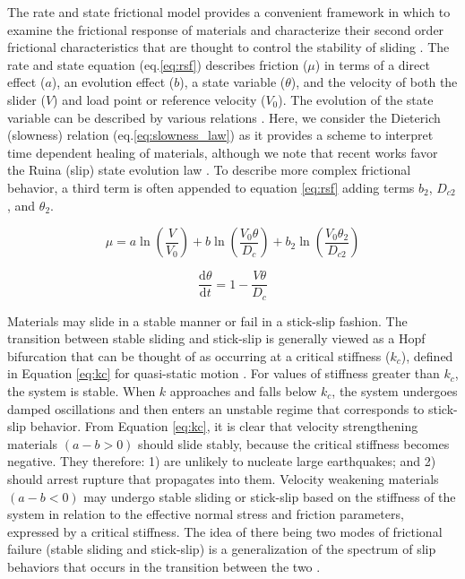 The rate and state frictional model provides a convenient framework in which to
examine the frictional response of materials and characterize their second order
frictional characteristics that are thought to control the stability of sliding
\cite{Brace_1966,Brace_Byerlee_1969,gu1984slip,Marone_1998}.  The rate and state
equation (eq.\ref{eq:rsf}) describes friction ($\mu$) in terms of a direct
effect ($a$), an evolution effect ($b$), a state variable ($\theta$), and the
velocity of both the slider ($V$) and load point or reference velocity ($V_0$).
The evolution of the state variable can be described by various relations
\cite{Marone_1998}.  Here, we consider the Dieterich (slowness) relation
(eq.\ref{eq:slowness_law}) as it provides a scheme to interpret time dependent
healing of materials, although we note that recent works favor the Ruina (slip)
state evolution law \cite{Marone2015,bayart2006evolution}.  To describe more
complex frictional behavior, a third term is often appended to   equation
\ref{eq:rsf} adding terms $b_2$, $D_{c2}$, and $\theta_2$.

\begin{equation}
	\mu =  a  \ln\left(\frac{V}{V_0}\right) + b \ln\left(\frac{V_0 \theta}{D_c}\right) + b_2 \ln\left(\frac{V_0 \theta_2}{D_{c2}}\right)
	\label{eq:rsf}
\end{equation}

\begin{equation}
	\frac{\text{d}\theta}{\text{d}t} = 1 - \frac{V \theta}{D_c}
	\label{eq:slowness_law}
\end{equation}


Materials may slide in a stable manner or fail in a stick-slip fashion.  The
transition between stable sliding and stick-slip is generally viewed as a Hopf
bifurcation that can be thought of as occurring at a critical stiffness ($k_c$),
defined in Equation \ref{eq:kc} for quasi-static motion
\cite{Rice_1983,gu1984slip}.  For values of stiffness greater than $k_c$, the
system is stable.  When $k$ approaches and falls below $k_c$, the system
undergoes damped oscillations and then enters an unstable regime that
corresponds to stick-slip behavior.  From Equation \ref{eq:kc}, it is clear that
velocity strengthening materials $(a-b > 0)$  should slide stably, because
the critical stiffness becomes negative.  They therefore: 1) are unlikely to
nucleate large earthquakes; and 2) should arrest rupture that propagates into
them. Velocity weakening materials $(a-b < 0)$ may undergo stable sliding or
stick-slip based on the stiffness of the system in relation to the effective
normal stress and friction parameters, expressed by a critical stiffness. The
idea of there being two modes of frictional failure (stable sliding and
stick-slip) is a generalization of the spectrum of slip behaviors that occurs in
the transition between the two \cite{Rice_1983}.

